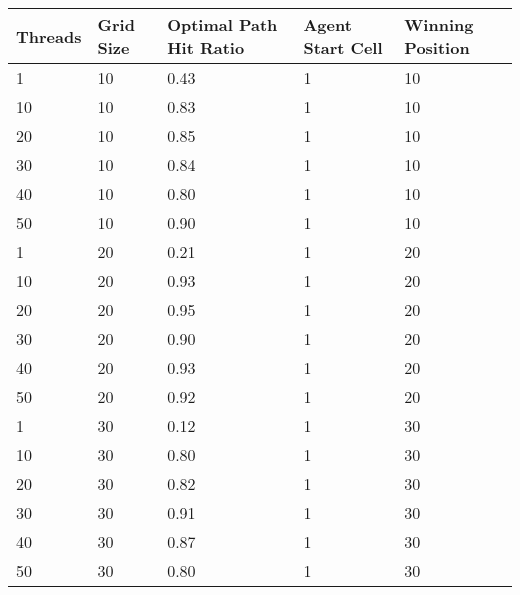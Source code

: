 \documentclass[12pt]{article}
\begin{document}
\begin{center}
\centering
\begin{tabular}{|l|l|l|l|l|} 
\hline
Threads & Grid Size & Optimal Path Hit Ratio & Agent Start Cell & Winning Position  \\ 
\hline
1       & 10        & 0.43                   & 1                & 10                \\ 
\hline
10      & 10        & 0.83                   & 1                & 10                \\ 
\hline
20      & 10        & 0.85                   & 1                & 10                \\ 
\hline
30      & 10        & 0.84                   & 1                & 10                \\ 
\hline
40      & 10        & 0.80                   & 1                & 10                \\ 
\hline
50      & 10        & 0.90                   & 1                & 10                \\ 
\hline
1       & 20        & 0.21                   & 1                & 20                \\ 
\hline
10      & 20        & 0.93                   & 1                & 20                \\ 
\hline
20      & 20        & 0.95                   & 1                & 20                \\ 
\hline
30      & 20        & 0.90                   & 1                & 20                \\ 
\hline
40      & 20        & 0.93                   & 1                & 20                \\ 
\hline
50      & 20        & 0.92                   & 1                & 20                \\ 
\hline
1       & 30        & 0.12                   & 1                & 30                \\ 
\hline
10      & 30        & 0.80                   & 1                & 30                \\ 
\hline
20      & 30        & 0.82                   & 1                & 30                \\ 
\hline
30      & 30        & 0.91                   & 1                & 30                \\ 
\hline
40      & 30        & 0.87                   & 1                & 30                \\ 
\hline
50      & 30        & 0.80                   & 1                & 30                \\ 

\end{tabular}
\end{center}
\end{document}
